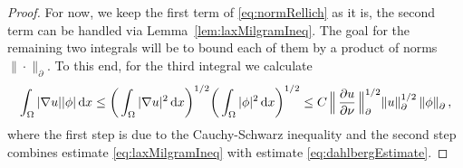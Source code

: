 \begin{proof}
  For now, we keep the first term of \eqref{eq:normRellich} as it is, the second term can be handled via Lemma~\ref{lem:laxMilgramIneq}. 
  The goal for the remaining two integrals will be to bound each of them by a product of norms $\|\cdot\|^{}_\partial$.
To this end, for the third integral we calculate
  \begin{align}
    \int_\Omega |\nabla u| |\phi| \, {\operatorname{d}\!{x}}
    \leq \bigg( \int_\Omega |\nabla u|^2 \, {\operatorname{d}\!{x}} \bigg)^{1/2} \bigg( \int_\Omega |\phi|^2 \, {\operatorname{d}\!{x}} \bigg)^{1/2}
    \leq C \, \Big\| \, \frac{\partial u}{\partial \nu}\, \Big\|_\partial^{1/2} \|u\|_\partial^{1/2} \, \|\phi\|^{}_\partial\,, \label{eq:nablaPhi}
  \end{align}
  where the first step is due to the Cauchy-Schwarz inequality and the second step combines estimate \eqref{eq:laxMilgramIneq} with estimate \eqref{eq:dahlbergEstimate}.


\end{proof}
